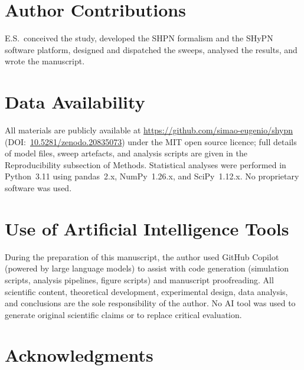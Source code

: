 \documentclass[11pt,a4paper]{article}
\begin{document}
\section*{Author Contributions}

E.S.\ conceived the study, developed the SHPN formalism and the SHyPN
software platform, designed and dispatched the sweeps, analysed the
results, and wrote the manuscript.

\section*{Data Availability}

\begin{sloppypar}
All materials are publicly available at
\url{https://github.com/simao-eugenio/shypn}
(DOI:~\href{https://doi.org/10.5281/zenodo.20835073}{10.5281/zenodo.20835073})
under the MIT open source licence;
full details of model files, sweep artefacts, and analysis scripts
are given in the Reproducibility subsection of Methods.
Statistical analyses were performed in Python~3.11 using
\mbox{pandas~2.x}, NumPy~1.26.x, and SciPy~1.12.x.
No proprietary software was used.
\end{sloppypar}

\section*{Use of Artificial Intelligence Tools}

During the preparation of this manuscript, the author used
GitHub Copilot (powered by large language models) to assist with code
generation (simulation scripts, analysis pipelines, figure scripts) and
manuscript proofreading.
All scientific content, theoretical development, experimental design,
data analysis, and conclusions are the sole responsibility of the author.
No AI tool was used to generate original scientific claims or to replace
critical evaluation.

\section*{Acknowledgments}
\end{document}
